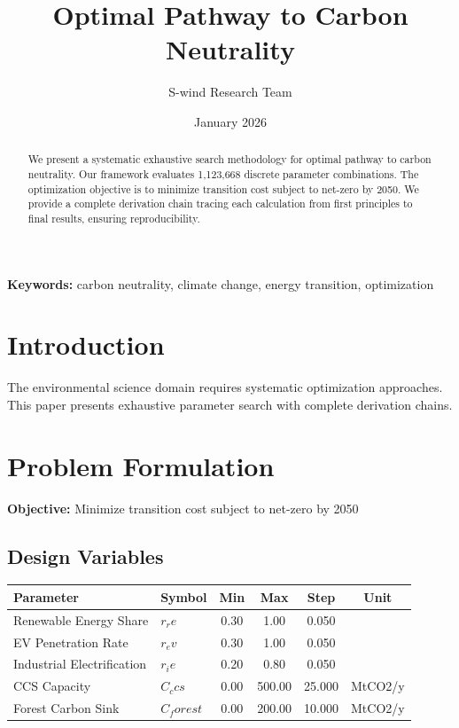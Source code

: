 \documentclass[11pt,a4paper]{article}
\title{Optimal Pathway to Carbon Neutrality}
\author{S-wind Research Team}
\date{January 2026}
\begin{document}
\maketitle

\begin{abstract}
We present a systematic exhaustive search methodology for optimal pathway to carbon neutrality. Our framework evaluates 1,123,668 discrete parameter combinations. The optimization objective is to minimize transition cost subject to net-zero by 2050. We provide a complete derivation chain tracing each calculation from first principles to final results, ensuring reproducibility.
\end{abstract}

\textbf{Keywords:} carbon neutrality, climate change, energy transition, optimization

\section{Introduction}

The environmental science domain requires systematic optimization approaches. This paper presents exhaustive parameter search with complete derivation chains.

\section{Problem Formulation}

\textbf{Objective:} Minimize transition cost subject to net-zero by 2050

\subsection{Design Variables}

\begin{center}
\begin{tabular}{llcccc}
\hline
Parameter & Symbol & Min & Max & Step & Unit \\
\hline
Renewable Energy Share & $r_re$ & 0.30 & 1.00 & 0.050 &  \\
EV Penetration Rate & $r_ev$ & 0.30 & 1.00 & 0.050 &  \\
Industrial Electrification & $r_ie$ & 0.20 & 0.80 & 0.050 &  \\
CCS Capacity & $C_ccs$ & 0.00 & 500.00 & 25.000 & MtCO2/y \\
Forest Carbon Sink & $C_forest$ & 0.00 & 200.00 & 10.000 & MtCO2/y \\
\hline
\end{tabular}
\end{center}
\end{document}
